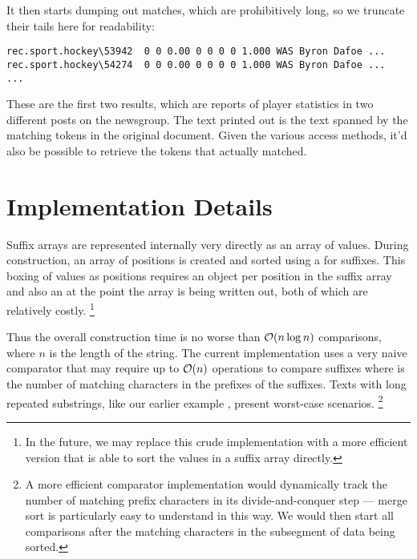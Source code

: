 It then starts dumping out matches, which are prohibitively long, so
we truncate their tails here for readability:
%
\begin{verbatim}
rec.sport.hockey\53942  0 0 0.00 0 0 0 0 1.000 WAS Byron Dafoe ...
rec.sport.hockey\54274  0 0 0.00 0 0 0 0 1.000 WAS Byron Dafoe ...
...
\end{verbatim}
%
These are the first two results, which are reports of player
statistics in two different posts on the 
newsgroup.  The text printed out is the text spanned by the matching
tokens in the original document.  Given the various access methods, it'd
also be possible to retrieve the tokens that actually matched.


\section{Implementation Details} 

Suffix arrays are represented internally very directly as an array of
 values.  During construction, an array of 
positions is created and sorted using a  for
suffixes.  This boxing of  values as 
positions requires an object per position in the suffix array and also
an  at the point the array is being written out, both of
which are relatively costly.
%
\footnote{In the future, we may replace this crude implementation with
  a more efficient version that is able to sort the  values
  in a suffix array directly.}

Thus the overall construction time is no worse than ${\mathcal O}(n \log n)$
comparisons, where $n$ is the length of the string.  The current
implementation uses a very naive comparator that may require up to
${\mathcal O}(n)$ operations to compare suffixes where  is the number
of matching characters in the prefixes of the suffixes.  Texts
with long repeated substrings, like our earlier example
, present worst-case scenarios.%
%
\footnote{A more efficient comparator implementation would dynamically
track the number of matching prefix characters in its divide-and-conquer
step --- merge sort is particularly easy to understand in this way.  We
would then start all comparisons after the matching characters in the
subsegment of data being sorted.}












